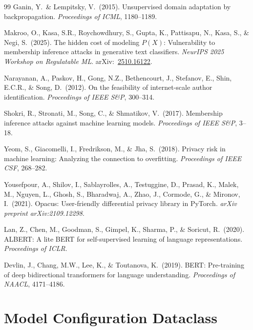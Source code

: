 \documentclass{article}
\begin{document}
{\begin{thebibliography}{99}
  Ganin, Y.\ \& Lempitsky, V.\ (2015).
  Unsupervised domain adaptation by backpropagation.
  {\it Proceedings of ICML}, 1180--1189.

  Makroo, O., Kasa, S.R., Roychowdhury, S., Gupta, K., Pattisapu, N.,
  Kasa, S., \& Negi, S.\ (2025).
  The hidden cost of modeling $P(X)$: Vulnerability to membership inference
  attacks in generative text classifiers.
  {\it NeurIPS 2025 Workshop on Regulatable ML}.
  arXiv:~\href{https://arxiv.org/abs/2510.16122}{2510.16122}.

  Narayanan, A., Paskov, H., Gong, N.Z., Bethencourt, J., Stefanov, E.,
  Shin, E.C.R., \& Song, D.\ (2012).
  On the feasibility of internet-scale author identification.
  {\it Proceedings of IEEE S\&P}, 300--314.

  Shokri, R., Stronati, M., Song, C., \& Shmatikov, V.\ (2017).
  Membership inference attacks against machine learning models.
  {\it Proceedings of IEEE S\&P}, 3--18.

  Yeom, S., Giacomelli, I., Fredrikson, M., \& Jha, S.\ (2018).
  Privacy risk in machine learning: Analyzing the connection to overfitting.
  {\it Proceedings of IEEE CSF}, 268--282.

  Yousefpour, A., Shilov, I., Sablayrolles, A., Testuggine, D.,
  Prasad, K., Malek, M., Nguyen, L., Ghosh, S., Bharadwaj, A.,
  Zhao, J., Cormode, G., \& Mironov, I.\ (2021).
  Opacus: User-friendly differential privacy library in PyTorch.
  {\it arXiv preprint arXiv:2109.12298}.

  Lan, Z., Chen, M., Goodman, S., Gimpel, K., Sharma, P., \& Soricut, R.\ (2020).
  ALBERT: A lite BERT for self-supervised learning of language representations.
  {\it Proceedings of ICLR}.

  Devlin, J., Chang, M.W., Lee, K., \& Toutanova, K.\ (2019).
  BERT: Pre-training of deep bidirectional transformers for language understanding.
  {\it Proceedings of NAACL}, 4171--4186.

\end{thebibliography}
}


\appendix
\section{Model Configuration Dataclass}
\end{document}
